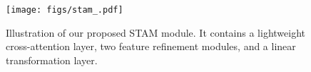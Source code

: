 \begin{figure}
\centering
\texttt{[image: figs/stam\_.pdf]}
\caption{Illustration of our proposed STAM module. It contains a lightweight cross-attention layer, two feature refinement modules, and a linear transformation layer.}
\label{fig: stam}
\end{figure}
